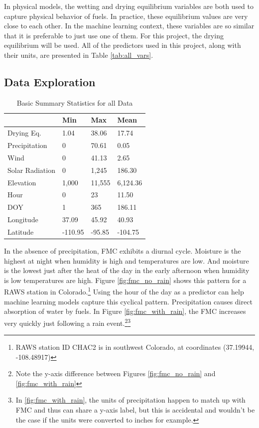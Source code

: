 \documentclass[11pt]{article}%
\begin{document}
In physical models, the wetting and drying equilibrium variables are both used to capture physical behavior of fuels. In practice, these equilibrium values are very close to each other. In the machine learning context, these variables are so similar that it is preferable to just use one of them. For this project, the drying equilibrium will be used. All of the predictors used in this project, along with their units, are presented in Table \ref{tab:all_vars}.

\subsection{Data Exploration}

\begin{table}[ht]
\centering
\caption{Basic Summary Statistics for all Data}
\label{tab:all_dat_summary}
\begin{tabular}{llll}
\toprule
 & Min & Max & Mean \\
\midrule
Drying Eq. & 1.04 & 38.06 & 17.74 \\
Precipitation & 0 & 70.61 & 0.05 \\
Wind & 0 & 41.13 & 2.65 \\
Solar Radiation & 0 & 1,245 & 186.30 \\
Elevation & 1,000 & 11,555 & 6,124.36 \\
Hour & 0 & 23 & 11.50 \\
DOY & 1 & 365 & 186.11 \\
Longitude & 37.09 & 45.92 & 40.93 \\
Latitude & -110.95 & -95.85 & -104.75 \\
\bottomrule
\end{tabular}
\end{table}

In the absence of precipitation, FMC exhibits a diurnal cycle. Moisture is the highest at night when humidity is high and temperatures are low. And moisture is the lowest just after the heat of the day in the early afternoon when humidity is low temperatures are high. Figure \ref{fig:fmc_no_rain} shows this pattern for a RAWS station in Colorado.\footnote{RAWS station ID CHAC2 is in southwest Colorado, at coordinates (37.19944,	-108.48917)} Using the hour of the day as a predictor can help machine learning models capture this cyclical pattern. Precipitation causes direct absorption of water by fuels. In Figure \ref{fig:fmc_with_rain}, the FMC increases very quickly just following a rain event.\footnote{Note the y-axis difference between Figures \ref{fig:fmc_no_rain} and \ref{fig:fmc_with_rain}}\footnote{In \ref{fig:fmc_with_rain}, the units of precipitation happen to match up with FMC and thus can share a y-axis label, but this is accidental and wouldn't be the case if the units were converted to inches for example.}
\end{document}
